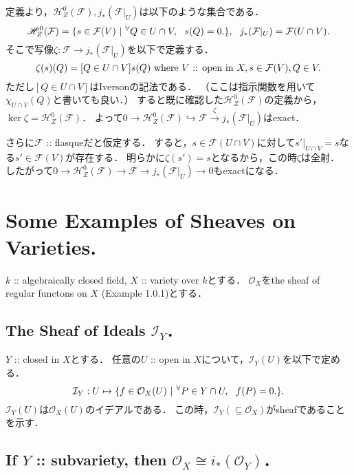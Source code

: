 \documentclass[a4paper]{jsarticle}
\newcommand{\shF}{\mathcal{F}}
\newcommand{\shI}{\mathcal{I}}
\newcommand{\OpenIn}{\text{ :: open in }}
\begin{document}
    定義より，$\mathscr{H}_Z^0(\shF), j_*(\shF|_U)$は以下のような集合である．
    \[
        \mathscr{H}_Z^0(\shF)=\{ s \in \shF(V) ~|~ \Forall{Q \in U \cap V} s(Q)=0. \},~~
        j_*(\shF|_U)=\shF(U \cap V).
    \]
    そこで写像$\zeta: \shF \to j_*(\shF|_U)$を以下で定義する．
    \[ \zeta(s)(Q)=[Q \in U \cap V]s(Q) \mwhere V \OpenIn X, s \in \shF(V), Q \in V. \]
    ただし$[Q \in U \cap V]$はIversonの記法である．
    （ここは指示関数を用いて$\chi_{U \cap V}(Q)$と書いても良い．）
    すると既に確認した$\mathscr{H}_Z^0(\shF)$の定義から，$\ker \zeta=\mathscr{H}_Z^0(\shF)$．
    よって$0 \to \mathscr{H}_Z^0(\shF) \hookrightarrow \shF \xrightarrow{\zeta} j_*(\shF|_U)$はexact．
    
    さらに$\shF$ :: flasqueだと仮定する．
    すると，$s \in \shF(U \cap V)$に対して$s'|_{U \cap V}=s$なる$s' \in \shF(V)$が存在する．
    明らかに$\zeta(s')=s$となるから，この時$\zeta$は全射．
    したがって$0 \to \mathscr{H}_Z^0(\shF) \to \shF \to j_*(\shF|_U) \to 0$もexactになる．

\section{Some Examples of Sheaves on Varieties.} %
    $k$ :: algebraically closed field, $X$ :: variety over $k$とする．
    $\mathcal{O}_X$をthe sheaf of regular functons on $X$ (Example 1.0.1)とする．
    \subsection{The Sheaf of Ideals $\shI_Y$．}
    $Y$ :: closed in $X$とする．
    任意の$U$ :: open in $X$について，$\shI_Y(U)$を以下で定める．
    \[ \shI_Y: U \mapsto \{ f \in \mathcal{O}_X(U) ~|~ \Forall{P \in Y \cap U} f(P)=0. \}. \]
    $\shI_Y(U)$は$\mathcal{O}_X(U)$のイデアルである．
    この時，$\shI_Y (\subseteq \mathcal{O}_X)$がsheafであることを示す．

    \subsection{If $Y$ :: subvariety, then $\mathcal{O}_X \cong i_*(\mathcal{O}_Y)$．}

    \subsection{ }
    \subsection{ }
\end{document}
